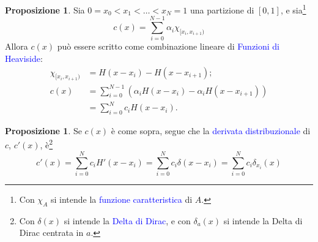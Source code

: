 \documentclass[10pt]{book}
\newcommand{\1}{\mathds{1}}
\theoremstyle{definition}%
\newtheorem{prop}[thm]{Proposizione}
\theoremstyle{plain}
\theoremstyle{remark}
\renewcommand{\href}[2]{\textcolor{blue}{#2}}
\begin{document}
\begin{prop}
Sia \(0=x_{0}<x_{1}<\dots<x_{N}=1\) una partizione di \([0,1]\), e sia\footnote{Con \(\chi_{A}\) si intende la \href{../../../../../org/roam/20250215160218-funzione_caratteristica.org}{funzione caratteristica} di \(A\).}
\begin{equation*}
c(x) = \sum_{i=0}^{N-1}\alpha_{i}\chi_{[x_{i},x_{i+1})}
\end{equation*}
Allora \(c(x)\) può essere scritto come combinazione lineare di \href{../../../../../org/roam/20250624161413-funzione_di_heaviside.org}{Funzioni di Heaviside}:
\begin{align*}
\chi_{[x_{i},x_{i+1})} &= H(x-x_{i})-H(x-x_{i+1})
;\\[1ex]
c(x) &= \sum_{i=0}^{N-1}\left(\alpha_{i}H(x-x_{i})-\alpha_{i} H(x-x_{i+1})\right)\\
&=\sum_{i=0}^{N} c_{i} H(x-x_{i}).
\end{align*}
\end{prop}
\begin{prop}
Se \(c(x)\) è come sopra, segue che la \href{../../../../../org/roam/20250701080039-derivata_distribuzioni.org}{derivata distribuzionale} di \(c\), \(c'(x)\), è\footnote{Con \(\delta(x)\) si intende la \href{../../../../../org/roam/20250625100133-delta_di_dirac.org}{Delta di Dirac}, e con \(\delta_{a}(x)\) si intende la Delta di Dirac centrata in \(a\).}
\begin{equation*}
c'(x) = \sum_{i=0}^{N} c_{i} H'(x-x_{i}) = \sum_{i=0}^{N} c_{i} \delta(x-x_{i}) = \sum_{i=0}^{N} c_{i} \delta_{x_{i}}(x)
\end{equation*}
\end{prop}
\end{document}
